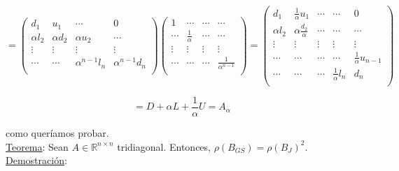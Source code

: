 $$ =
	\begin{pmatrix}
        d_{1} & u_{1} & \cdots & 0\\
        \alpha l_{2} & \alpha d_{2} & \alpha u_{2} & \cdots\\
        \vdots & \vdots & \vdots & \vdots\\
        \cdots & \cdots & \alpha^{n - 1}l_{n} & \alpha^{n - 1}d_{n}\\
	\end{pmatrix}
	\begin{pmatrix}
        1 & \cdots & \cdots & \cdots\\
        \cdots & \frac{1}{\alpha} & \cdots & \cdots\\
        \vdots & \vdots & \vdots & \vdots\\
        \cdots & \cdots & \cdots & \frac{1}{\alpha^{n - 1}}\\
	\end{pmatrix}
	=
	\begin{pmatrix}
        d_{1} & \frac{1}{\alpha}u_{1} & \cdots & \cdots & 0\\
        \alpha l_{2} & \alpha \frac{d_{2}}{\alpha} & \cdots & \cdots & \cdots\\
        \vdots & \vdots & \vdots & \vdots & \vdots\\
        \cdots & \cdots & \cdots & \cdots & \frac{1}{\alpha}u_{n - 1}\\
        \cdots & \cdots & \cdots & \frac{1}{\alpha}l_{n} & d_{n}\\
	\end{pmatrix}
$$

$$
	= D + \alpha L  + \frac{1}{\alpha}U = A_{\alpha}
$$

como quer\'iamos probar.\\

\underline{Teorema}: Sean $A \in \mathbb{R}^{n \times n}$ tridiagonal. Entonces, $\rho(B_{GS}) = \rho(B_{J})^{2}$.\\

\underline{Demostraci\'on}:

